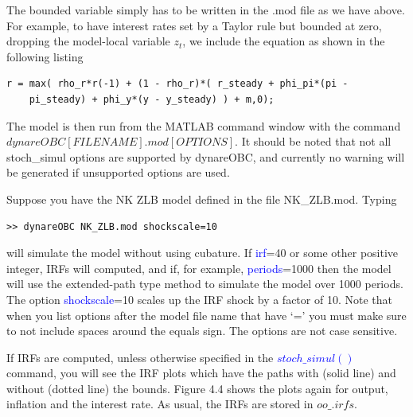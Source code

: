 \documentclass[10pt,math=newtx,citestyle=gb7714-2015,bibstyle=gb7714-2015]{elegantbook}
\begin{document}
{The bounded variable simply has to be written in the .mod file as we have above. For example, to have interest rates set by a Taylor rule but bounded at zero, dropping the model-local variable $z_t$, we include the equation as shown
in the following listing

\begin{lstlisting}[frame=shadowbox]
	r = max( rho_r*r(-1) + (1 - rho_r)*( r_steady + phi_pi*(pi -
	pi_steady) + phi_y*(y - y_steady) ) + m,0);
\end{lstlisting}

The model is then run from the MATLAB command window with the command \textbf{$dynareOBC [FILENAME].mod [OPTIONS]$}. It should be noted that not all stoch\_simul options are supported by dynareOBC, and currently no warning will be generated if unsupported options are used.

Suppose you have the NK ZLB model defined in the file NK\_ZLB.mod. Typing

\begin{lstlisting}[frame=shadowbox]
	>> dynareOBC NK_ZLB.mod shockscale=10
\end{lstlisting}

will simulate the model without using cubature. If \textcolor{blue}{irf}=40 or some other positive integer, IRFs will computed, and if, for example, \textcolor{blue}{periods}=1000 then the model will use the extended-path type method to simulate the model over 1000
periods. The option \textcolor{blue}{shockscale}=10 scales up the IRF shock by a factor of 10. Note that when you list options after the model file name that have ‘=’ you
must make sure to not include spaces around the equals sign. The options are not case sensitive.

If IRFs are computed, unless otherwise specified in the \textcolor{blue}{$stoch\_simul()$} command, you will see the IRF plots which have the paths with (solid line) and without (dotted line) the bounds. Figure 4.4 shows the plots again for output, inflation and the interest rate. As usual, the IRFs are stored in $oo\_.irfs$.

}
\end{document}
